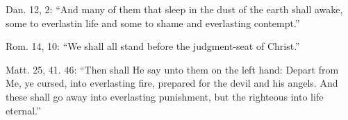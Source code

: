 \documentclass[
]{book}
\begin{document}
Dan. 12, 2: ``And many of them that sleep in the dust of the earth shall awake, some to everlastin life and some to shame and everlasting contempt.''

Rom. 14, 10: ``We shall all stand before the judgment-seat of Christ.''

Matt. 25, 41. 46: ``Then shall He say unto them on the left hand: Depart from Me, ye cursed, into everlasting fire, prepared for the devil and his angels. And these shall go away into everlasting punishment, but the righteous into life eternal.''

\printindex
\end{document}
